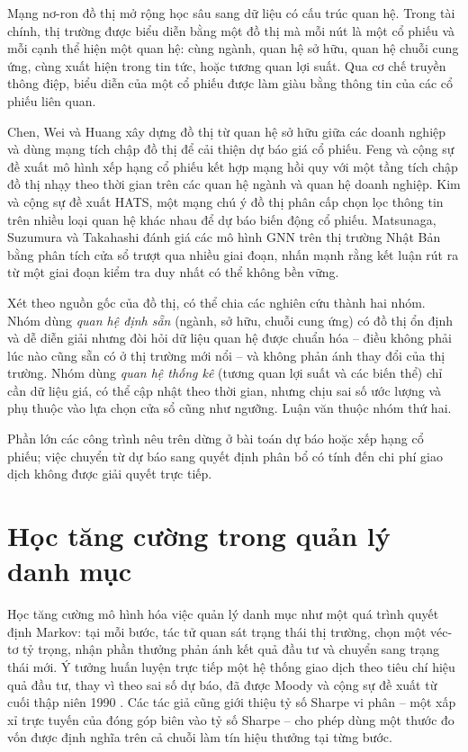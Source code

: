 Mạng nơ-ron đồ thị \cite{scarselli2009,gilmer2017} mở rộng học sâu sang dữ liệu có cấu trúc quan hệ. Trong tài chính, thị trường được biểu diễn bằng một đồ thị mà mỗi nút là một cổ phiếu và mỗi cạnh thể hiện một quan hệ: cùng ngành, quan hệ sở hữu, quan hệ chuỗi cung ứng, cùng xuất hiện trong tin tức, hoặc tương quan lợi suất. Qua cơ chế truyền thông điệp, biểu diễn của một cổ phiếu được làm giàu bằng thông tin của các cổ phiếu liên quan.

Chen, Wei và Huang \cite{chen2018} xây dựng đồ thị từ quan hệ sở hữu giữa các doanh nghiệp và dùng mạng tích chập đồ thị để cải thiện dự báo giá cổ phiếu. Feng và cộng sự \cite{feng2019} đề xuất mô hình xếp hạng cổ phiếu kết hợp mạng hồi quy với một tầng tích chập đồ thị nhạy theo thời gian trên các quan hệ ngành và quan hệ doanh nghiệp. Kim và cộng sự \cite{kim2019} đề xuất HATS, một mạng chú ý đồ thị phân cấp chọn lọc thông tin trên nhiều loại quan hệ khác nhau để dự báo biến động cổ phiếu. Matsunaga, Suzumura và Takahashi \cite{matsunaga2019} đánh giá các mô hình GNN trên thị trường Nhật Bản bằng phân tích cửa sổ trượt qua nhiều giai đoạn, nhấn mạnh rằng kết luận rút ra từ một giai đoạn kiểm tra duy nhất có thể không bền vững.

Xét theo nguồn gốc của đồ thị, có thể chia các nghiên cứu thành hai nhóm. Nhóm dùng \emph{quan hệ định sẵn} (ngành, sở hữu, chuỗi cung ứng) có đồ thị ổn định và dễ diễn giải nhưng đòi hỏi dữ liệu quan hệ được chuẩn hóa -- điều không phải lúc nào cũng sẵn có ở thị trường mới nổi -- và không phản ánh thay đổi của thị trường. Nhóm dùng \emph{quan hệ thống kê} (tương quan lợi suất và các biến thể) chỉ cần dữ liệu giá, có thể cập nhật theo thời gian, nhưng chịu sai số ước lượng và phụ thuộc vào lựa chọn cửa sổ cũng như ngưỡng. Luận văn thuộc nhóm thứ hai.

Phần lớn các công trình nêu trên dừng ở bài toán dự báo hoặc xếp hạng cổ phiếu; việc chuyển từ dự báo sang quyết định phân bổ có tính đến chi phí giao dịch không được giải quyết trực tiếp.

\section{Học tăng cường trong quản lý danh mục}

Học tăng cường mô hình hóa việc quản lý danh mục như một quá trình quyết định Markov: tại mỗi bước, tác tử quan sát trạng thái thị trường, chọn một véc-tơ tỷ trọng, nhận phần thưởng phản ánh kết quả đầu tư và chuyển sang trạng thái mới. Ý tưởng huấn luyện trực tiếp một hệ thống giao dịch theo tiêu chí hiệu quả đầu tư, thay vì theo sai số dự báo, đã được Moody và cộng sự đề xuất từ cuối thập niên 1990 \cite{moody1998,moody2001}. Các tác giả cũng giới thiệu tỷ số Sharpe vi phân -- một xấp xỉ trực tuyến của đóng góp biên vào tỷ số Sharpe -- cho phép dùng một thước đo vốn được định nghĩa trên cả chuỗi làm tín hiệu thưởng tại từng bước.

